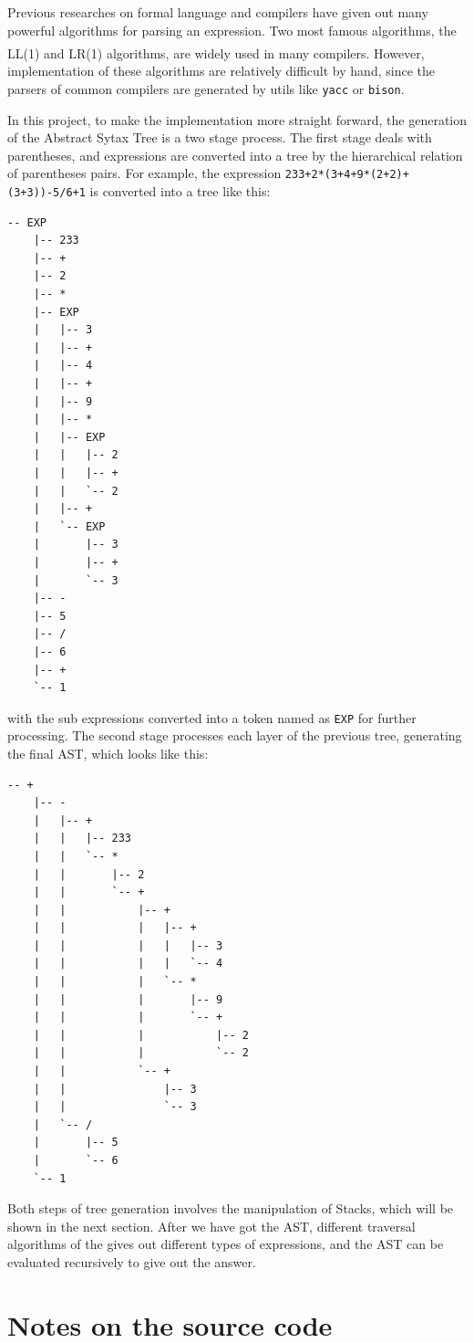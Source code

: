 \documentclass[cn,black,12pt,normal]{elegantnote}
\newcommand{\uct}[1]{\textsuperscript{\textsuperscript{\cite{#1}}}}
\begin{document}
Previous researches on formal language and compilers have given out many powerful algorithms for parsing an expression. Two most famous algorithms, the LL(1)\uct{stearns1969property} and LR(1)\uct{wiki:Canonical_LR_parser} algorithms, are widely used in many compilers. However, implementation of these algorithms are relatively difficult by hand, since the parsers of common compilers are generated by utils like \lstinline{yacc} or \lstinline{bison}.

In this project, to make the implementation more straight forward, the generation of the Abstract Sytax Tree is a two stage process. The first stage deals with parentheses, and expressions are converted into a tree by the hierarchical relation of parentheses pairs. For example, the expression \lstinline{233+2*(3+4+9*(2+2)+(3+3))-5/6+1} is converted into a tree like this:
\begin{lstlisting}
-- EXP
    |-- 233
    |-- +
    |-- 2
    |-- *
    |-- EXP
    |   |-- 3
    |   |-- +
    |   |-- 4
    |   |-- +
    |   |-- 9
    |   |-- *
    |   |-- EXP
    |   |   |-- 2
    |   |   |-- +
    |   |   `-- 2
    |   |-- +
    |   `-- EXP
    |       |-- 3
    |       |-- +
    |       `-- 3
    |-- -
    |-- 5
    |-- /
    |-- 6
    |-- +
    `-- 1
\end{lstlisting}
with the sub expressions converted into a token named as \lstinline{EXP} for further processing. The second stage processes each layer of the previous tree, generating the final AST, which looks like this:
\begin{lstlisting}
-- +
    |-- -
    |   |-- +
    |   |   |-- 233
    |   |   `-- *
    |   |       |-- 2
    |   |       `-- +
    |   |           |-- +
    |   |           |   |-- +
    |   |           |   |   |-- 3
    |   |           |   |   `-- 4
    |   |           |   `-- *
    |   |           |       |-- 9
    |   |           |       `-- +
    |   |           |           |-- 2
    |   |           |           `-- 2
    |   |           `-- +
    |   |               |-- 3
    |   |               `-- 3
    |   `-- /
    |       |-- 5
    |       `-- 6
    `-- 1
\end{lstlisting}
Both steps of tree generation involves the manipulation of Stacks, which will be shown in the next section. After we have got the AST, different traversal algorithms of the gives out different types of expressions, and the AST can be evaluated recursively to give out the answer.

\section{Notes on the source code}
\end{document}
